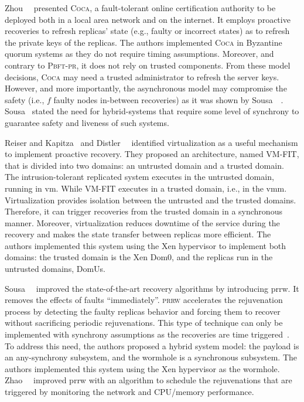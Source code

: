 Zhou~\etal{}~\cite{Zhou:2002} presented \textsc{Coca}, a fault-tolerant online certification authority to be deployed both in a local area network and on the internet.
It employs proactive recoveries to refresh replicas' state (e.g., faulty or incorrect states) as to refresh the private keys of the replicas.
The authors implemented \textsc{Coca} in Byzantine quorum systems as they do not require timing assumptions.
Moreover, and contrary to \textsc{Pbft-pr}, it does not rely on trusted components.
From these model decisions, \textsc{Coca} may need a trusted administrator to refresh the server keys.
However, and more importantly, the asynchronous model may compromise the safety (i.e., $f$ faulty nodes in-between recoveries) as it was shown by Sousa~\etal{}~\cite{Sousa:2007}. 
Sousa~\etal{} stated the need for hybrid-systems that require some level of synchrony to guarantee safety and liveness of such systems.


Reiser and Kapitza~\cite{Reiser:2007} and Distler~\etal{}~\cite{Distler:2008} identified virtualization as a useful mechanism to implement proactive recovery. 
They proposed an architecture, named \textsc{VM-FIT}, that is divided into two domains: an untrusted domain and a trusted domain.
The intrusion-tolerant replicated system executes in the untrusted domain, running in \gls{vm}. 
While \textsc{VM-FIT} executes in a trusted domain, i.e., in the \gls{vmm}. 
Virtualization provides isolation between the untrusted and the trusted domains. 
Therefore, it can trigger recoveries from the trusted domain in a synchronous manner. 
Moreover, virtualization reduces downtime of the service during the recovery and makes the state transfer between replicas more efficient. 
The authors implemented this system using the Xen hypervisor to implement both domains: the trusted domain is the Xen Dom0, and the replicas run in the untrusted domains, DomUs.

Sousa~\etal{}~\cite{Sousa:2010} improved the state-of-the-art recovery algorithms by introducing \gls{prrw}. 
It removes the effects of faults ``immediately''. 
\textsc{\gls{prrw}} accelerates the rejuvenation process by detecting the faulty replicas behavior and forcing them to recover without sacrificing periodic rejuvenations. 
This type of technique can only be implemented with synchrony assumptions as the recoveries are time triggered~\cite{Sousa:2005}. 
To address this need, the authors proposed a hybrid system model: the payload is an any-synchrony subsystem, and the wormhole is a synchronous subsystem. 
The authors implemented this system using the Xen hypervisor as the wormhole. 
Zhao~\etal{}~\cite{Zhao:2012} improved \gls{prrw} with an algorithm to schedule the rejuvenations that are triggered by monitoring the network and CPU/memory performance.


